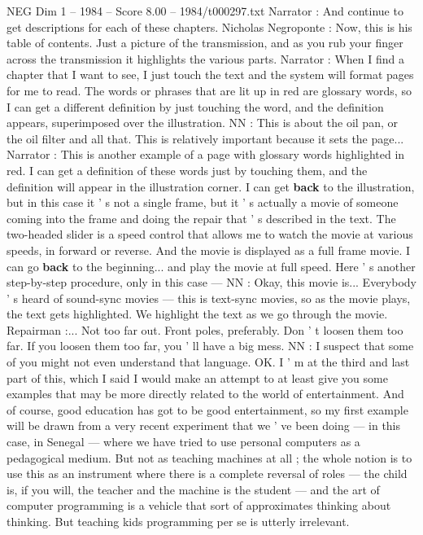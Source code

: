 \begin{textsample}{NEG Dim 1 – 1984 – Score 8.00 – 1984/t000297.txt}
Narrator : And continue to get descriptions for each of these chapters.
Nicholas Negroponte : Now, this is his table of contents.
Just a picture of the transmission, and as you rub your finger across the transmission it highlights the various parts.
Narrator : When I find a chapter that I want to see, I just touch the text and the system will format pages for me to read.
The words or phrases that are lit up in red are glossary words, so I can get a different definition by just touching the word, and the definition appears, superimposed over the illustration.
NN : This is about the oil pan, or the oil filter and all that.
This is relatively important because it sets the page...
Narrator : This is another example of a page with glossary words highlighted in red.
I can get a definition of these words just by touching them, and the definition will appear in the illustration corner.
I can get \textbf{back} to the illustration, but in this case it ' s not a single frame, but it ' s actually a movie of someone coming into the frame and doing the repair that ' s described in the text.
The two-headed slider is a speed control that allows me to watch the movie at various speeds, in forward or reverse.
And the movie is displayed as a full frame movie.
I can go \textbf{back} to the beginning... and play the movie at full speed.
Here ' s another step-by-step procedure, only in this case — NN : Okay, this movie is...
Everybody ' s heard of sound-sync movies — this is text-sync movies, so as the movie plays, the text gets highlighted.
We highlight the text as we go through the movie.
Repairman :...
Not too far out.
Front poles, preferably.
Don ' t loosen them too far.
If you loosen them too far, you ' ll have a big mess.
NN : I suspect that some of you might not even understand that language.
OK.
I ' m at the third and last part of this, which I said I would make an attempt to at least give you some examples that may be more directly related to the world of entertainment.
And of course, good education has got to be good entertainment, so my first example will be drawn from a very recent experiment that we ' ve been doing — in this case, in Senegal — where we have tried to use personal computers as a pedagogical medium.
But not as teaching machines at all ; the whole notion is to use this as an instrument where there is a complete reversal of roles — the child is, if you will, the teacher and the machine is the student — and the art of computer programming is a vehicle that sort of approximates thinking about thinking.
But teaching kids programming per se is utterly irrelevant.

\end{textsample}

